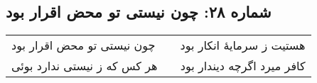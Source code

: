 \begin{center}
\section*{شماره ۲۸: چون نیستی تو محض اقرار بود}
\label{sec:028}
\begin{longtable}{l p{0.5cm} r}
چون نیستی تو محض اقرار بود
&&
هستیت ز سرمایهٔ انکار بود
\\
هر کس که ز نیستی ندارد بوئی
&&
کافر میرد اگرچه دیندار بود
\\
\end{longtable}
\end{center}
